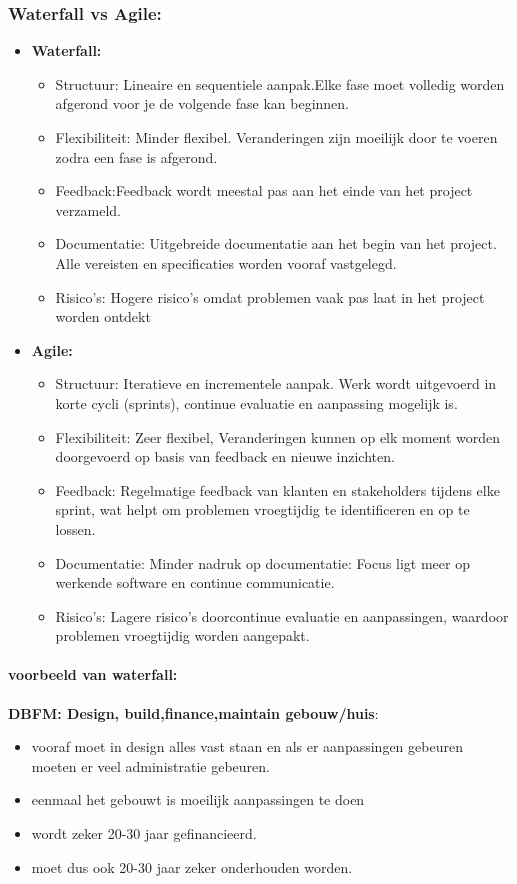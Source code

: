 \documentclass[12pt]{article}
\begin{document}
\subsubsection{Waterfall vs Agile:}
\begin{itemize}
    \item \textbf{Waterfall:}\begin{itemize}
        \item Structuur: Lineaire en sequentiele aanpak.Elke fase moet volledig worden afgerond voor je de volgende fase kan beginnen.
        \item Flexibiliteit: Minder flexibel. Veranderingen zijn moeilijk door te voeren zodra een fase is afgerond.
        \item Feedback:Feedback wordt meestal pas aan het einde van het project verzameld.
        \item Documentatie: Uitgebreide documentatie aan het begin van het project. Alle vereisten en specificaties worden vooraf vastgelegd.
        \item Risico's: Hogere risico's omdat problemen vaak pas laat in het project worden ontdekt
    \end{itemize}
    \item \textbf{Agile:}\begin{itemize}
        \item Structuur: Iteratieve en incrementele aanpak. Werk wordt uitgevoerd in korte cycli (sprints), continue evaluatie en aanpassing mogelijk is.
        \item Flexibiliteit: Zeer flexibel, Veranderingen kunnen op elk moment worden doorgevoerd op basis van feedback en nieuwe inzichten.
        \item Feedback: Regelmatige feedback van klanten en stakeholders tijdens elke sprint, wat helpt om problemen vroegtijdig te identificeren en op te lossen.
        \item Documentatie: Minder nadruk op documentatie: Focus ligt meer op werkende software en continue communicatie.
        \item Risico's: Lagere risico's doorcontinue evaluatie en aanpassingen, waardoor problemen vroegtijdig worden aangepakt.
    \end{itemize}
\end{itemize} 
\paragraph{voorbeeld van waterfall:}
 \textbf{DBFM: Design, build,finance,maintain gebouw/huis}:\begin{itemize}
    \item vooraf moet in design alles vast staan en als er aanpassingen gebeuren moeten er veel administratie gebeuren.
    \item eenmaal het gebouwt is moeilijk aanpassingen te doen
    \item wordt zeker 20-30 jaar gefinancieerd.
    \item moet dus ook 20-30 jaar zeker onderhouden worden.
\end{itemize}
\end{document}
